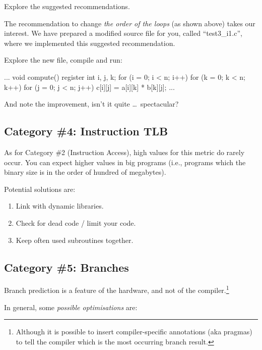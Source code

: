Explore the suggested recommendations.

The recommendation to change \emph{the order of the loops} (as shown above) takes our interest. We have prepared a modified source file for you, called ``test3\_i1.c'', where we implemented this suggested recommendation.

Explore the new file, compile and run:

\begin{prompt}
...
void compute()
{
register int i, j, k;
for (i = 0; i < n; i++)
  for (k = 0; k < n; k++)
    for (j = 0; j < n; j++)
      c[i][j] = a[i][k] * b[k][j];
}
...
\end{prompt}

And note the improvement, isn't it quite \ldots\  spectacular?

\subsection{Category \#4: Instruction TLB}
\label{subsec:CAT4_Optimizing_Instruction_TLB}

As for Category \#2 (Instruction Access), high values for this metric do rarely occur. You can expect higher values in big programs (i.e., programs which the binary size is in the order of hundred of megabytes).

Potential solutions are:

\begin{enumerate}
  \item  Link with dynamic libraries.
  \item  Check for dead code / limit your code.
  \item  Keep often used subroutines together.
\end{enumerate}

\subsection{Category \#5: Branches}
\label{subsec:CAT5_Optimizing_Branches}

Branch prediction is a feature of the hardware, and not of the compiler.\footnote{Although it is possible to insert compiler-specific annotations (aka pragmas) to tell the compiler which is the most occurring branch result.}

In general, some \emph{possible optimisations} are:

